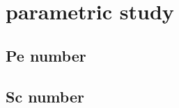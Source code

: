 \documentclass[../thesis.tex]{subfiles}
\begin{document}
\chapter{parametric study}
\label{chp: para_stud}

\section{Pe number}

\section{Sc number}
\end{document}
